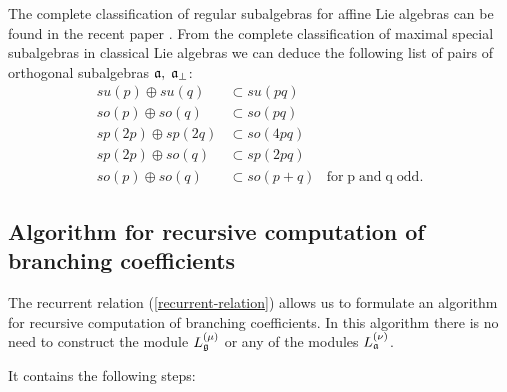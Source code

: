 \documentclass[12pt]{iopart}
\theoremstyle{definition}
\theoremstyle{definition}
\theoremstyle{definition}
\theoremstyle{definition}
\begin{document}
The complete classification of regular subalgebras for affine Lie algebras
can be found in the recent paper \cite{1751-8121-41-36-365204}. From the complete
classification of maximal special subalgebras in classical Lie algebras \cite
{dynkin1952semisimple} we can deduce the following list of pairs of
orthogonal subalgebras $\frak{a},\;\frak{a}_{\bot }$:
\begin{equation*}
\begin{array}{lll}
su(p)\oplus su(q) & \subset su(pq) &  \\
so(p)\oplus so(q) & \subset so(pq) &  \\
sp(2p)\oplus sp(2q) & \subset so(4pq) &  \\
sp(2p)\oplus so(q) & \subset sp(2pq) &  \\
so(p)\oplus so(q) & \subset so(p+q) & \mathrm{{for}\;p\;{and}\;q\;{odd}.}
\end{array}
\end{equation*}


\subsection{Algorithm for recursive computation of branching coefficients}

\label{sec:algorithm}

The recurrent relation (\ref{recurrent-relation}) allows us to formulate an
algorithm for recursive computation of branching coefficients. In this
algorithm there is no need to construct the module $L^{(\mu)}_{\frak{g}}$ or
any of the modules $L^{(\nu)}_{\frak{a}}$.

It contains the following steps:
\end{document}

